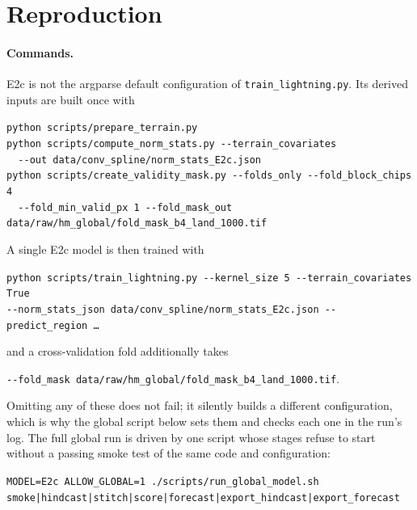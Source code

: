 \documentclass[11pt,a4paper]{article}
\newcommand{\code}[1]{\texttt{\small #1}}
\begin{document}
\appendix
\section{Reproduction}

\paragraph{Commands.} E2c is not the argparse default configuration of
\code{train\_lightning.py}. Its derived inputs are built once with
\begin{center}
\code{python scripts/prepare\_terrain.py}\\
\code{python scripts/compute\_norm\_stats.py -{}-terrain\_covariates}\\
\code{\ \ -{}-out data/conv\_spline/norm\_stats\_E2c.json}\\
\code{python scripts/create\_validity\_mask.py -{}-folds\_only -{}-fold\_block\_chips 4}\\
\code{\ \ -{}-fold\_min\_valid\_px 1 -{}-fold\_mask\_out data/raw/hm\_global/fold\_mask\_b4\_land\_1000.tif}
\end{center}
A single E2c model is then trained with
\begin{center}
\code{python scripts/train\_lightning.py -{}-kernel\_size 5 -{}-terrain\_covariates True}\\
\code{-{}-norm\_stats\_json data/conv\_spline/norm\_stats\_E2c.json -{}-predict\_region \ldots}
\end{center}
and a cross-validation fold additionally takes
\begin{center}
\code{-{}-fold\_mask data/raw/hm\_global/fold\_mask\_b4\_land\_1000.tif}.
\end{center}
Omitting any of these does not fail; it silently builds a different configuration, which is
why the global script below sets them and checks each one in the run's log.
The full global run is driven by one script whose stages refuse to start without a passing smoke
test of the same code and configuration:
\begin{center}
\code{MODEL=E2c ALLOW\_GLOBAL=1 ./scripts/run\_global\_model.sh}
\code{smoke|hindcast|stitch|score|forecast|export\_hindcast|export\_forecast}
\end{center}
\end{document}
